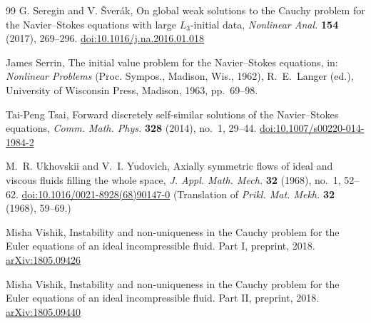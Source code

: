 \begin{thebibliography}{99}
G. Seregin and V. \v{S}ver\'{a}k, On global weak solutions to the Cauchy problem for the Navier--Stokes
equations with large $L_3$-initial data, \emph{Nonlinear Anal.} \textbf{154} (2017), 269--296.
\href{https://doi.org/10.1016/j.na.2016.01.018}{doi:10.1016/j.na.2016.01.018}

James Serrin, The initial value problem for the Navier--Stokes equations,
in: \emph{Nonlinear Problems} (Proc. Sympos., Madison, Wis., 1962), R.~E.~Langer (ed.),
University of Wisconsin Press, Madison, 1963, pp.~69--98.

Tai-Peng Tsai, Forward discretely self-similar solutions of the Navier--Stokes equations,
\emph{Comm. Math. Phys.} \textbf{328} (2014), no.~1, 29--44.
\href{https://doi.org/10.1007/s00220-014-1984-2}{doi:10.1007/s00220-014-1984-2}

M.~R. Ukhovskii and V.~I. Yudovich, Axially symmetric flows of ideal and viscous fluids filling the whole space,
\emph{J. Appl. Math. Mech.} \textbf{32} (1968), no.~1, 52--62.
\href{https://doi.org/10.1016/0021-8928(68)90147-0}{doi:10.1016/0021-8928(68)90147-0}
(Translation of \emph{Prikl. Mat. Mekh.} \textbf{32} (1968), 59--69.)

Misha Vishik, Instability and non-uniqueness in the Cauchy problem for the Euler equations of an ideal
incompressible fluid. Part I, preprint, 2018.
\href{https://arxiv.org/abs/1805.09426}{arXiv:1805.09426}

Misha Vishik, Instability and non-uniqueness in the Cauchy problem for the Euler equations of an ideal
incompressible fluid. Part II, preprint, 2018.
\href{https://arxiv.org/abs/1805.09440}{arXiv:1805.09440}

\end{thebibliography}
